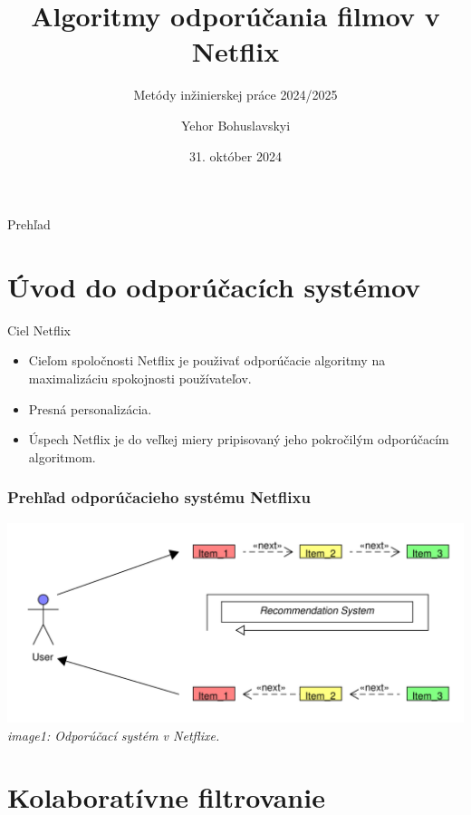 \documentclass{beamer}
\title{Algoritmy odporúčania filmov v Netflix}
\subtitle{\vspace{3mm} Metódy inžinierskej práce 2024/2025}
\author{Yehor Bohuslavskyi}
\institute{Slovenská technická univerzita v Bratislave}
\date{31. október 2024}
\begin{document}
\begin{frame}
    \titlepage
\end{frame}

\begin{frame}{Prehľad}
    \tableofcontents
\end{frame}

\section{Úvod do odporúčacích systémov}

\begin{frame}{Ciel Netflix}
    \begin{itemize}
        \item Cieľom spoločnosti Netflix je použivať odporúčacie algoritmy na maximalizáciu spokojnosti používateľov.
        \item Presná personalizácia.
        \item Úspech Netflix je do veľkej miery pripisovaný jeho pokročilým odporúčacím algoritmom.
    \end{itemize}
\end{frame}


\begin{frame}
    \frametitle{Prehľad odporúčacieho systému Netflixu}
    \centering
    \includegraphics[width=1\textwidth]{Images_tables/RecommendationSystem_pdf.pdf}
    \vspace{1em}
    \textit{image1: Odporúčací systém v Netflixe.}
\end{frame}


\section{Kolaboratívne filtrovanie}
\end{document}
